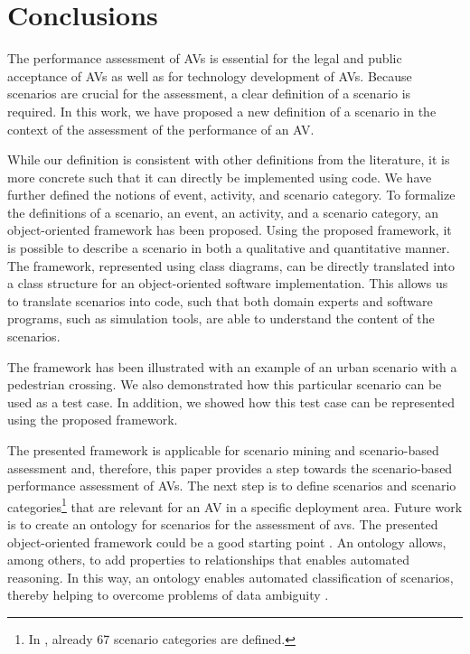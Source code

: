 \section{Conclusions}
\label{sec:conclusion}

The performance assessment of AVs is essential for the legal and public acceptance of AVs as well as for technology development of AVs. 
Because scenarios are crucial for the assessment, a clear definition of a scenario is required.
In this work, we have proposed a new definition of a scenario in the context of the assessment of the performance of an AV. 
 
While our definition is consistent with other definitions from the literature, it is more concrete such that it can directly be implemented using code.
We have further defined the notions of event, activity, and scenario category. 
To formalize the definitions of a scenario, an event, an activity, and a scenario category, an \cstartb object-oriented framework \cendb has been proposed. Using the proposed \cstartb framework\cendb, it is possible to describe a scenario in both a qualitative and quantitative manner. The \cstartb framework\cendb, represented using \cstartb class diagrams\cendb, can be directly translated into a class structure for an object-oriented software implementation. This allows us to translate scenarios into code, such that both domain experts and software programs, such as simulation tools, are able to understand the content of the scenarios. 

The \cstartb framework \cendb has been illustrated with an example of an urban scenario with a pedestrian crossing. 
We also demonstrated how this particular scenario can be used as a test case. In addition, we showed how this test case can be represented using the proposed \cstartb framework\cendb.

The presented \cstartb framework \cendb is applicable for scenario mining \autocite{paardekooper2019dataset6000km, degelder2020scenariomining} and scenario-based assessment \autocite{elrofai2018scenario, putz2017pegasus} and, therefore, this paper provides a step towards the scenario-based performance assessment of AVs. The next step is to define scenarios and scenario categories\footnote{In \autocite{degelder2019scenariocategories}, already 67 scenario categories are defined.} that are relevant for an AV in a specific deployment area. 
\cstartc Future work is to create an ontology for scenarios for the assessment of \acp{av}. The presented object-oriented framework could be a good starting point \autocite{siricharoen2009ontology}. An ontology allows, among others, to add properties to relationships that enables automated reasoning. In this way, an ontology enables automated classification of scenarios, thereby helping to overcome problems of data ambiguity \autocite{OpenSCENARIO2}. \cendc

